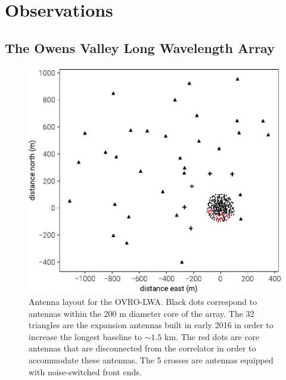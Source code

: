 \documentclass[twocolumn]{aastex61}
\begin{document}
\section{Observations}\label{sec:observations}

\subsection{The Owens Valley Long Wavelength Array}

\begin{figure}[t]
    \includegraphics[width=\columnwidth]{figures/antenna-layout/antenna-layout}
    \caption{
        Antenna layout for the OVRO-LWA. Black dots correspond to antennas within the 200 m diameter
        core of the array. The 32 triangles are the expansion antennas built in early 2016 in order
        to increase the longest baseline to $\sim1.5$ km. The red dots are core antennas that are
        disconnected from the correlator in order to accommodate these antennas. The 5 crosses are
        antennas equipped with noise-switched front ends.
    }
    \label{fig:antenna-layout}
\end{figure}
\end{document}
